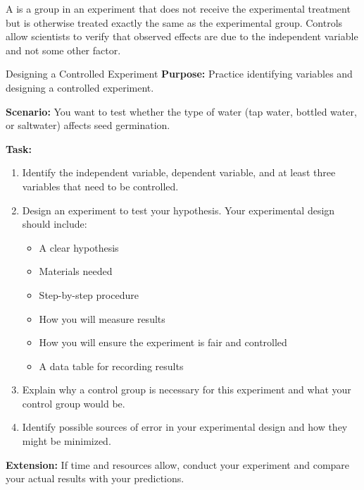 A  is a group in an experiment that does not receive the experimental treatment but is otherwise treated exactly the same as the experimental group. Controls allow scientists to verify that observed effects are due to the independent variable and not some other factor.


\begin{investigation}{Designing a Controlled Experiment}
\textbf{Purpose:} Practice identifying variables and designing a controlled experiment.

\textbf{Scenario:} You want to test whether the type of water (tap water, bottled water, or saltwater) affects seed germination.

\textbf{Task:}
\begin{enumerate}
    \item Identify the independent variable, dependent variable, and at least three variables that need to be controlled.
    
    \item Design an experiment to test your hypothesis. Your experimental design should include:
    \begin{itemize}
        \item A clear hypothesis
        \item Materials needed
        \item Step-by-step procedure
        \item How you will measure results
        \item How you will ensure the experiment is fair and controlled
        \item A data table for recording results
    \end{itemize}
    
    \item Explain why a control group is necessary for this experiment and what your control group would be.
    
    \item Identify possible sources of error in your experimental design and how they might be minimized.
\end{enumerate}

\textbf{Extension:} If time and resources allow, conduct your experiment and compare your actual results with your predictions.
\end{investigation}

